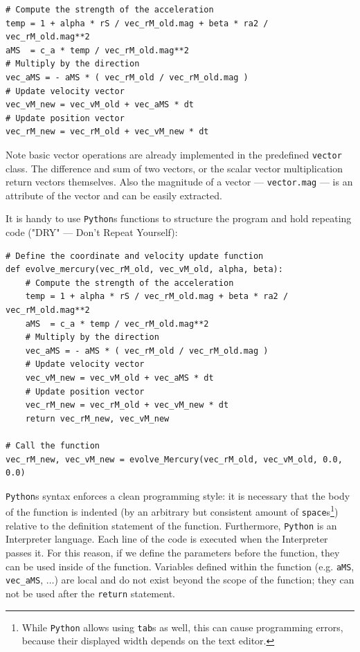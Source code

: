 \documentclass[12pt,ngerman,american]{iopart}
\newcommand{\python}[0]{\texttt{Python}}
\newcommand{\code}[1]{{\scriptsize\colorbox{light-gray}{\texttt{#1}}}}
\begin{document}
\begin{lstlisting}
# Compute the strength of the acceleration
temp = 1 + alpha * rS / vec_rM_old.mag + beta * ra2 / vec_rM_old.mag**2
aMS  = c_a * temp / vec_rM_old.mag**2
# Multiply by the direction
vec_aMS = - aMS * ( vec_rM_old / vec_rM_old.mag )
# Update velocity vector
vec_vM_new = vec_vM_old + vec_aMS * dt
# Update position vector
vec_rM_new = vec_rM_old + vec_vM_new * dt
\end{lstlisting}
Note basic vector operations are already implemented in the predefined \texttt{vector} class.
The difference and sum of two vectors, or the scalar vector multiplication return vectors themselves.
Also the magnitude of a vector --- \code{vector.mag} --- is an attribute of the vector and can be easily extracted.

It is handy to use \texttt{Python}s functions to structure the program and hold repeating code ("DRY" --- Don't Repeat Yourself):
\begin{lstlisting}
# Define the coordinate and velocity update function
def evolve_mercury(vec_rM_old, vec_vM_old, alpha, beta):
    # Compute the strength of the acceleration
    temp = 1 + alpha * rS / vec_rM_old.mag + beta * ra2 / vec_rM_old.mag**2
    aMS  = c_a * temp / vec_rM_old.mag**2
    # Multiply by the direction
    vec_aMS = - aMS * ( vec_rM_old / vec_rM_old.mag )
    # Update velocity vector
    vec_vM_new = vec_vM_old + vec_aMS * dt
    # Update position vector
    vec_rM_new = vec_rM_old + vec_vM_new * dt
    return vec_rM_new, vec_vM_new

# Call the function
vec_rM_new, vec_vM_new = evolve_Mercury(vec_rM_old, vec_vM_old, 0.0, 0.0)
\end{lstlisting}
\python{}s syntax enforces a clean programming style: it is necessary that the body of the function is indented (by an arbitrary but consistent amount of \texttt{space}s\footnote{While \python{} allows using \texttt{tab}s as well, this can cause programming errors, because their displayed width depends on the text editor.}) relative to the definition statement of the function.
Furthermore, \python{} is an Interpreter language.
Each line of the code is executed when the Interpreter passes it.
For this reason, if we define the parameters before the function, they can be used inside of the function.
Variables defined within the function (e.g. \code{aMS}, \code{vec\_aMS}, $\dots$) are local and do not exist beyond the scope of the function; they can not be used after the \texttt{return} statement.
\end{document}
